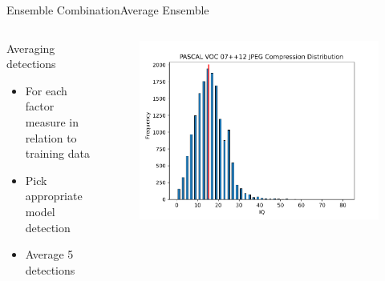 \begin{frame}{Ensemble Combination}{Average Ensemble}
\begin{columns}
        \begin{block}{Averaging detections}
        \begin{itemize}
            \item For each factor measure in relation to training data
            \item Pick appropriate model detection
            \item Average 5 detections
        \end{itemize}
    \end{block}
        \begin{figure}
            \includegraphics[width=1.0 \textwidth]{figs/JPEGCompressiondistred.pdf}
        \end{figure}
    \end{columns}
\end{frame}

